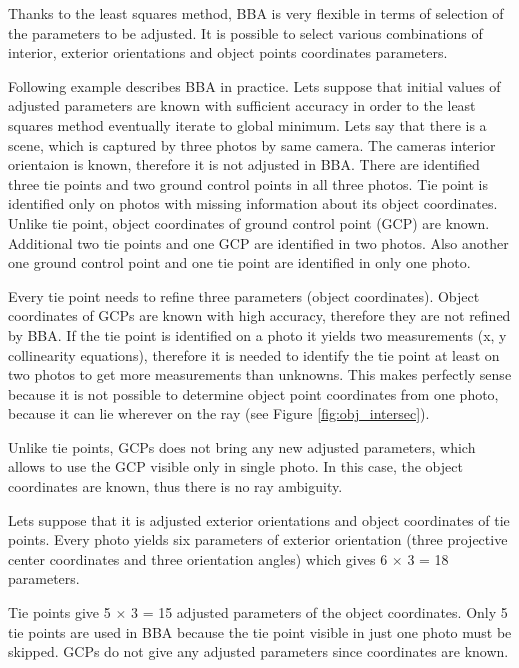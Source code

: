 \documentclass[a4paper,12pt]{article}
\begin{document}
Thanks to the least squares method, BBA is very flexible in terms of selection of the parameters to be adjusted. 
It is possible to select various combinations of interior, exterior orientations and object points coordinates parameters. 

Following example describes BBA in practice.
Lets suppose that initial values of adjusted parameters are known with sufficient accuracy in order to the least squares
method eventually iterate to global minimum.
Lets say that there is a scene, which is captured by three photos by same camera.
The cameras interior orientaion is known, therefore it is not adjusted in BBA.
There are identified three tie points and two ground control points in all three photos.
Tie point is identified only on photos with missing information about its object coordinates.  
Unlike tie point, object coordinates of ground control point (GCP) are known.
Additional two tie points and one GCP are identified in two photos.
Also another one ground control point and one tie point are identified 
in only one photo. 


Every tie point needs to refine three parameters (object coordinates). 
Object coordinates of GCPs are known with high accuracy, therefore they are not refined by BBA. 
If the tie point is identified on a photo it yields two measurements (x, y collinearity equations), 
therefore it is needed to identify the tie point at least on two photos to get more measurements 
than unknowns. This makes perfectly sense because it is not possible to determine object point coordinates from one photo,
because it can lie wherever on the ray (see Figure \ref{fig:obj_intersec}).

Unlike tie points, GCPs does not bring any new adjusted parameters, which 
allows to use the GCP visible only in single photo. In this case, the object coordinates 
are known, thus there is no ray ambiguity. 

Lets suppose that it is adjusted exterior orientations and object coordinates of tie points.  
Every photo yields six parameters of exterior orientation (three projective center coordinates and three orientation angles) 
which gives 6 $\times$ 3 = 18 parameters. 

Tie points give 5 $\times$ 3 = 15 adjusted parameters of the object coordinates. 
Only 5 tie points are used in BBA because the tie point visible in just one photo must be skipped.
GCPs do not give any adjusted parameters since coordinates are known.
\end{document}
